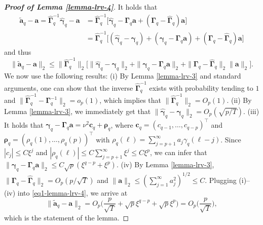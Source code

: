\begin{proof}[\textnormal{\textbf{Proof of Lemma \ref{lemma-lrv-4}}}] It holds that   
\begin{align*}
\widetilde{\boldsymbol{a}}_q - \boldsymbol{a} = \widehat{\boldsymbol{\Gamma}}_q^{-1} \widehat{\boldsymbol{\gamma}}_q - \boldsymbol{a}   
 & = \widehat{\boldsymbol{\Gamma}}_q^{-1} \big[ \widehat{\boldsymbol{\gamma}}_q - \boldsymbol{\Gamma}_q \boldsymbol{a} + ( \boldsymbol{\Gamma}_q - \widehat{\boldsymbol{\Gamma}}_q )\boldsymbol{a} \big] \\
 & = \widehat{\boldsymbol{\Gamma}}_q^{-1} \big[ (\widehat{\boldsymbol{\gamma}}_q - \boldsymbol{\gamma}_q) + (\boldsymbol{\gamma}_q - \boldsymbol{\Gamma}_q \boldsymbol{a}) + (\boldsymbol{\Gamma}_q - \widehat{\boldsymbol{\Gamma}}_q)\boldsymbol{a} \big] 
\end{align*}
and thus 
\begin{equation}\label{eq1-lemma-lrv-4}
\| \widetilde{\boldsymbol{a}}_q - \boldsymbol{a} \|_2 \le \| \widehat{\boldsymbol{\Gamma}}_q^{-1} \|_2 \big[ \| \widehat{\boldsymbol{\gamma}}_q - \boldsymbol{\gamma}_q \|_2 + \| \boldsymbol{\gamma}_q - \boldsymbol{\Gamma}_q \boldsymbol{a} \|_2 + \| \boldsymbol{\Gamma}_q - \widehat{\boldsymbol{\Gamma}}_q \|_2 \| \boldsymbol{a} \|_2 \big]. 
\end{equation}
We now use the following results: (i) By Lemma \ref{lemma-lrv-3} and standard arguments, one can show that the inverse $\widehat{\boldsymbol{\Gamma}}_q^{-1}$ exists with probability tending to $1$ and $\| \widehat{\boldsymbol{\Gamma}}_q^{-1}  - \boldsymbol{\Gamma}_q^{-1} \|_2 = o_p(1)$, which implies that $\| \widehat{\boldsymbol{\Gamma}}_q^{-1} \|_2 = O_p(1)$. (ii) By Lemma \ref{lemma-lrv-3}, we immediately get that $\| \widehat{\boldsymbol{\gamma}}_q - \boldsymbol{\gamma}_q \|_2 = O_p(\sqrt{p/T})$. (iii) It holds that $\boldsymbol{\gamma}_q - \boldsymbol{\Gamma}_q \boldsymbol{a} =\nu^2 \boldsymbol{c}_q + \boldsymbol{\rho}_q$, where $\boldsymbol{c}_q = (c_{q-1},\ldots,c_{q-p})^\top$ and $\boldsymbol{\rho}_q = (\rho_q(1),\ldots,\rho_q(p))^\top$ with $\rho_q(\ell) = \sum_{j=p+1}^{\infty} a_j \gamma_q(\ell-j)$. Since $|c_j| \le C \xi^j$ and $|\rho_q(\ell)| \le C \sum_{j=p+1}^{\infty} \xi^j \le C \xi^p$, we can infer that $\| \boldsymbol{\gamma}_q - \boldsymbol{\Gamma}_q \boldsymbol{a} \|_2 \le C \sqrt{p} (\xi^{q-p} + \xi^p )$. (iv) By Lemma \ref{lemma-lrv-3}, $\| \boldsymbol{\Gamma}_q - \widehat{\boldsymbol{\Gamma}}_q \|_2 = O_p(p/\sqrt{T})$ and $\| \boldsymbol{a} \|_2 \le ( \sum_{j=1}^{\infty} a_j^2 )^{1/2} \le C$. Plugging (i)--(iv) into \eqref{eq1-lemma-lrv-4}, we arrive at 
\[ \| \widetilde{\boldsymbol{a}}_q - \boldsymbol{a} \|_2 = O_p \Big( \frac{p}{\sqrt{T}} + \sqrt{p} \xi^{q-p} + \sqrt{p} \xi^p \Big) = O_p\Big(\frac{p}{\sqrt{T}}\Big), \]
which is the statement of the lemma.
\end{proof}


